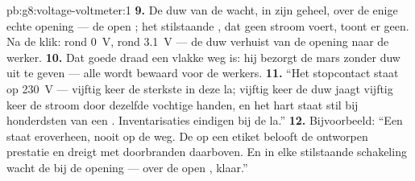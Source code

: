 \begin{solution}{pb:g8:voltage-voltmeter:1}
\textbf{9.} De duw van de  wacht, in zijn geheel, over de
enige echte opening --- de open ; het stilstaande
, dat geen stroom voert, toont er geen. Na de klik:
 rond \qty{0}{V},  rond
\qty{3.1}{V} --- de duw verhuist van de opening naar de werker.
\textbf{10.} Dat goede draad een vlakke weg is: hij bezorgt de mars
zonder duw uit te geven --- alle  wordt bewaard voor de
werkers.
\textbf{11.} ``Het stopcontact staat op \qty{230}{V} --- vijftig keer
de sterkste  in deze la; vijftig keer de duw jaagt
vijftig keer de stroom door dezelfde vochtige handen, en het hart staat
stil bij honderdsten van een . Inventarisaties eindigen
bij de la.''
\textbf{12.} Bijvoorbeeld: ``Een  staat eroverheen,
nooit op de weg. De  op een etiket belooft de
ontworpen prestatie en dreigt met doorbranden daarboven. En in elke
stilstaande schakeling wacht de  bij de opening --- over
de open , klaar.''
\end{solution}
